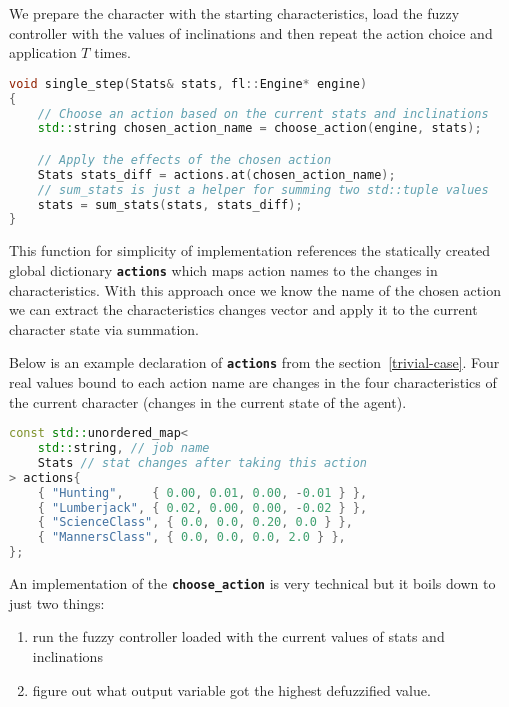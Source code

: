 \documentclass[12pt, a4paper]{article}
\begin{document}
	We prepare the character with the starting characteristics, load the fuzzy controller with the values of inclinations and then repeat the action choice and application $T$ times.
	
	\begin{lstlisting}[language=c++]
void single_step(Stats& stats, fl::Engine* engine)
{
	// Choose an action based on the current stats and inclinations
	std::string chosen_action_name = choose_action(engine, stats);

	// Apply the effects of the chosen action
	Stats stats_diff = actions.at(chosen_action_name);
	// sum_stats is just a helper for summing two std::tuple values
	stats = sum_stats(stats, stats_diff);
}
	\end{lstlisting}
	
	This function for simplicity of implementation references the statically created global dictionary \textbf{\texttt{actions}} which maps action names to the changes in characteristics.
	With this approach once we know the name of the chosen action we can extract the characteristics changes vector and apply it to the current character state via summation.
	
	Below is an example declaration of \textbf{\texttt{actions}} from the section~\ref{trivial-case}.
	Four real values bound to each action name are changes in the four characteristics of the current character (changes in the current state of the agent).
	
	\begin{lstlisting}[language=c++]
const std::unordered_map<
	std::string, // job name
	Stats // stat changes after taking this action
> actions{
	{ "Hunting",    { 0.00, 0.01, 0.00, -0.01 } },
	{ "Lumberjack", { 0.02, 0.00, 0.00, -0.02 } },
	{ "ScienceClass", { 0.0, 0.0, 0.20, 0.0 } },
	{ "MannersClass", { 0.0, 0.0, 0.0, 2.0 } },
};	
	\end{lstlisting}
	
	An implementation of the \textbf{\texttt{choose\_action}} is very technical but it boils down to just two things:
	
	\begin{enumerate}
		\item run the fuzzy controller loaded with the current values of stats and inclinations
		\item figure out what output variable got the highest defuzzified value.
	\end{enumerate}
	
\end{document}
